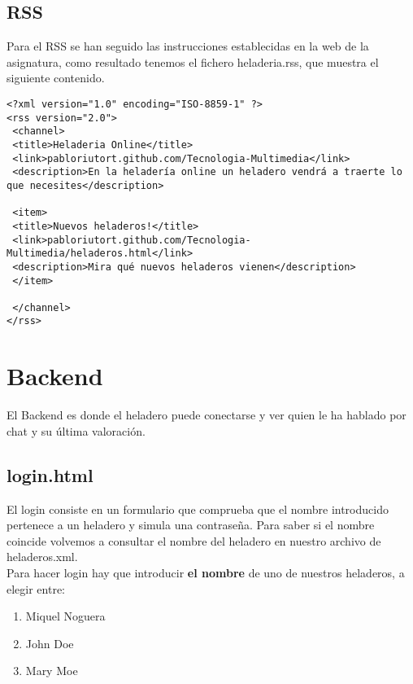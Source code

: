 \documentclass[11pt,a4paper]{article}
\begin{document}
\subsection{RSS}
Para el RSS se han seguido las instrucciones establecidas en la web de la asignatura, como resultado tenemos el fichero heladeria.rss, que muestra el siguiente contenido.
\begin{lstlisting}
<?xml version="1.0" encoding="ISO-8859-1" ?>
<rss version="2.0">
 <channel>
 <title>Heladeria Online</title>
 <link>pabloriutort.github.com/Tecnologia-Multimedia</link>
 <description>En la heladería online un heladero vendrá a traerte lo que necesites</description>

 <item>
 <title>Nuevos heladeros!</title>
 <link>pabloriutort.github.com/Tecnologia-Multimedia/heladeros.html</link>
 <description>Mira qué nuevos heladeros vienen</description>
 </item>
 
 </channel>
</rss>
\end{lstlisting}

\section{Backend}
El Backend es donde el heladero puede conectarse y ver quien le ha hablado por chat y su última valoración.

\subsection{login.html}
El login consiste en un formulario que comprueba que el nombre introducido pertenece a un heladero y simula una contraseña. Para saber si el nombre coincide volvemos a consultar el nombre del heladero en nuestro archivo de heladeros.xml.\\
Para hacer login hay que introducir \textbf{el nombre} de uno de nuestros heladeros, a elegir entre:

\begin{enumerate}
\item Miquel Noguera
\item John Doe
\item Mary Moe
\end{enumerate}
\end{document}
